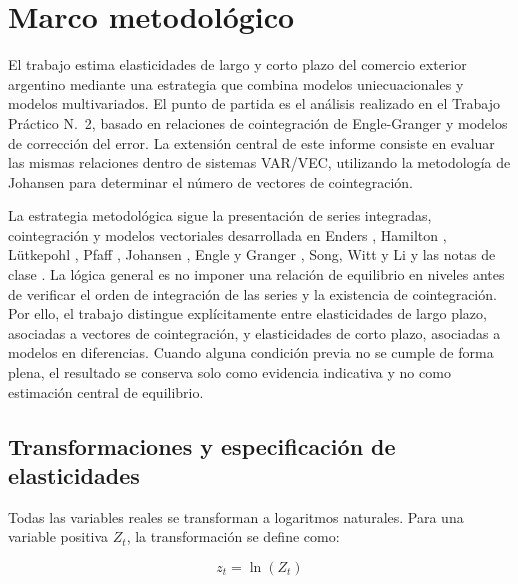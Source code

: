 \documentclass[11pt,a4paper]{article}
\begin{document}
	\section{Marco metodológico}
	\label{sec:marco-metodologico}

	El trabajo estima elasticidades de largo y corto plazo del comercio exterior
	argentino mediante una estrategia que combina modelos uniecuacionales y modelos
	multivariados. El punto de partida es el análisis realizado en el Trabajo
	Práctico N.\textdegree~2, basado en relaciones de cointegración de
	Engle-Granger y modelos de corrección del error. La extensión central de este
	informe consiste en evaluar las mismas relaciones dentro de sistemas VAR/VEC,
	utilizando la metodología de Johansen para determinar el número de vectores de
	cointegración.

	La estrategia metodológica sigue la presentación de series integradas,
	cointegración y modelos vectoriales desarrollada en Enders
	\cite{enders_2014}, Hamilton \cite{hamilton_1994}, Lütkepohl
	\cite{lutkepohl_2005}, Pfaff \cite{pfaff_2008}, Johansen
	\cite{johansen_1995}, Engle y Granger \cite{engle_granger_1987}, Song, Witt y
	Li \cite{song_witt_li_2008} y las notas de clase \cite{fabris_2026}. La lógica
	general es no imponer una relación de equilibrio en niveles antes de verificar
	el orden de integración de las series y la existencia de cointegración. Por
	ello, el trabajo distingue explícitamente entre elasticidades de largo plazo,
	asociadas a vectores de cointegración, y elasticidades de corto plazo, asociadas
	a modelos en diferencias. Cuando alguna condición previa no se cumple de forma
	plena, el resultado se conserva solo como evidencia indicativa y no como
	estimación central de equilibrio.

	\subsection{Transformaciones y especificación de elasticidades}
	\label{subsec:metodologia-transformaciones}

	Todas las variables reales se transforman a logaritmos naturales. Para una
	variable positiva \(Z_t\), la transformación se define como:

	\begin{equation}
		z_t = \ln(Z_t)
		\label{eq:tp3-transformacion-logaritmica}
	\end{equation}
\end{document}
